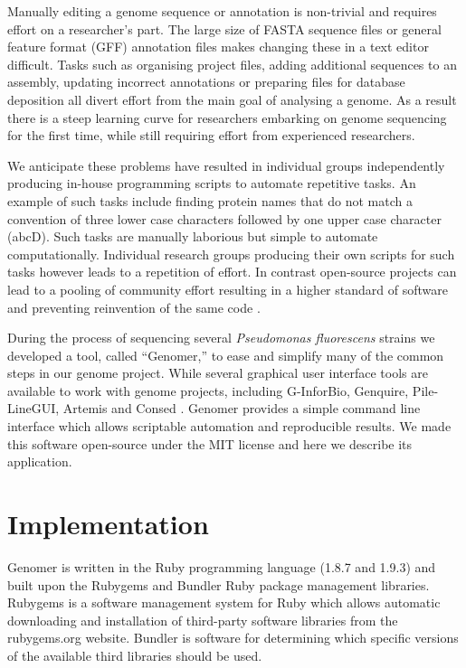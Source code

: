 \documentclass[10pt]{article}
\begin{document}
Manually editing a genome sequence or annotation is non-trivial and requires
effort on a researcher's part. The large size of FASTA sequence files or
general feature format (GFF) annotation files makes changing these in a text
editor difficult. Tasks such as organising project files, adding additional
sequences to an assembly, updating incorrect annotations or preparing files for
database deposition all divert effort from the main goal of analysing a genome.
As a result there is a steep learning curve for researchers embarking on genome
sequencing for the first time, while still requiring effort from experienced
researchers.

We anticipate these problems have resulted in individual groups independently
producing in-house programming scripts to automate repetitive tasks. An example
of such tasks include finding protein names that do not match a convention of
three lower case characters followed by one upper case character (abcD). Such
tasks are manually laborious but simple to automate computationally. Individual
research groups producing their own scripts for such tasks however leads to a
repetition of effort. In contrast open-source projects can lead to a pooling of
community effort resulting in a higher standard of software and preventing
reinvention of the same code \cite{ince2012}.

During the process of sequencing several \emph{Pseudomonas fluorescens} strains
we developed a tool, called ``Genomer,'' to ease and simplify many of the
common steps in our genome project. While several graphical user interface
tools are available to work with genome projects, including G-InforBio,
Genquire, Pile-LineGUI, Artemis and Consed \cite{tanaka2006, wilkinson2002,
lopez2011, carver2012, gordon1998}. Genomer provides a simple command line
interface which allows scriptable automation and reproducible results. We made
this software open-source under the MIT license and here we describe its
application.

\section*{Implementation}

Genomer is written in the Ruby programming language (1.8.7 and 1.9.3)
\cite{ruby-lang,goto2010} and built upon the Rubygems and Bundler Ruby package
management libraries. Rubygems is a software management system for Ruby which
allows automatic downloading and installation of third-party software libraries
from the rubygems.org website. Bundler is software for determining which
specific versions of the available third libraries should be used.
\end{document}
